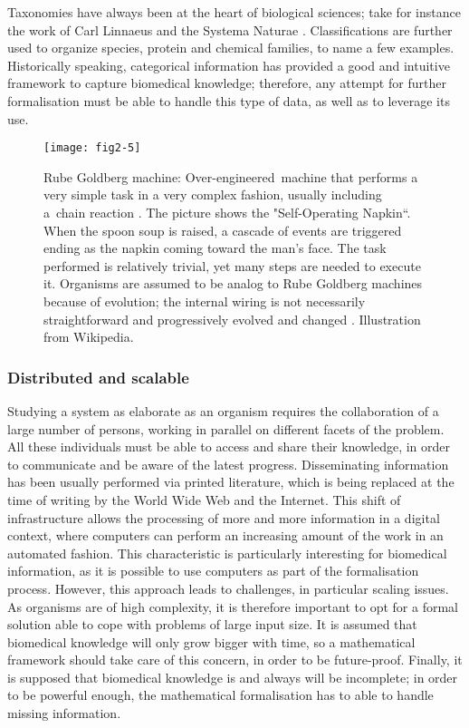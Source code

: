 Taxonomies have always been at the heart of biological sciences; take for instance the work of Carl Linnaeus and the Systema Naturae \citep{von1770systema}. Classifications are further used to organize species, protein and chemical families, to name a few examples. Historically speaking, categorical information has provided a good and intuitive framework to capture biomedical knowledge; therefore, any attempt for further formalisation must be able to handle this type of data, as well as to leverage its use.

\begin{figure}[ht]
    \centering
    \texttt{[image: fig2-5]}
    \caption{Rube Goldberg machine: Over-engineered machine that performs a very simple task in a very complex fashion, usually including a chain reaction \citep{rubewiki}. The picture shows the "Self-Operating Napkin“. When the spoon soup is raised, a cascade of events are triggered ending as the napkin coming toward the man’s face. The task performed is relatively trivial, yet many steps are needed to execute it. Organisms are assumed to be analog to Rube Goldberg machines because of evolution; the internal wiring is not necessarily straightforward and progressively evolved and changed \citep{ravasz2002hierarchical}. Illustration from Wikipedia.}
    \label{fig2-5}
\end{figure}

\subsubsection{Distributed and scalable}
\label{reqscale}

Studying a system as elaborate as an organism requires the collaboration of a large number of persons, working in parallel on different facets of the problem. All these individuals must be able to access and share their knowledge, in order to communicate and be aware of the latest progress. Disseminating information has been usually performed via printed literature, which is being replaced at the time of writing by the World Wide Web and the Internet. This shift of infrastructure allows the processing of more and more information in a digital context, where computers can perform an increasing amount of the work in an automated fashion. This characteristic is particularly interesting for biomedical information, as it is possible to use computers as part of the formalisation process. However, this approach leads to challenges, in particular scaling issues. As organisms are of high complexity, it is therefore important to opt for a formal solution able to cope with problems of large input size. It is assumed that biomedical knowledge will only grow bigger with time, so a mathematical framework should take care of this concern, in order to be future-proof. Finally, it is supposed that biomedical knowledge is and always will be incomplete; in order to be powerful enough, the mathematical formalisation has to able to handle missing information.

